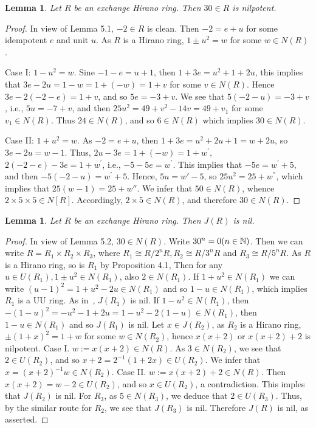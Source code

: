 \documentclass[12pt, reqno]{amsart}
\newtheorem{lem}[thm]{Lemma}
\numberwithin{equation}{section}
\begin{document}
\begin{lem} Let $R$ be an exchange Hirano ring. Then $30\in R$ is nilpotent.\end{lem}
\begin{proof} In view of Lemma 5.1, $-2\in R$ is clean. Then $-2=e+u$ for some idempotent $e$ and unit $u$. As $R$ is a Hirano ring, $1\pm u^2=w$ for some $w\in N(R)$.

Case I: $1-u^2=w$. Sine $-1-e=u+1$, then $1+3e=u^2+1+2u$, this implies that $3e-2u=1-w=1+(-w)=1+v$ for some $v\in N(R)$. Hence $3e-2(-2-e)=1+v$, and so $5e=-3+v$. We see that $5(-2-u)=-3+v$, i.e., $5u=-7+v$, and then $25u^2=49+v^2-14v=49+v_1$ for some $v_1\in N(R)$. Thus $24\in N(R)$, and so $6\in N(R)$ which implies $30\in N(R)$.

Case II: $1+u^2=w$. As $-2=e+u$, then $1+3e=u^2+2u+1=w+2u$, so $3e-2u=w-1$. Thus, $2u-3e=1+(-w)=1+w^{\prime}$, $2(-2-e)-3e=1+w^{\prime}$, i.e., $-5-5e=w^{\prime}$. This implies that $-5e=w^{\prime}+5$, and then $-5(-2-u)=w^{\prime}+5$. Hence, $5u=w{\prime}-5$, so $25u^2=25+w^{''}$, which implies that $25(w-1)=25+w{''}$. We infer that $50\in N(R)$, whence $2\times 5\times 5\in N[R]$. Accordingly, $2\times 5\in N(R)$, and therefore $30\in N(R)$.\end{proof}

\begin{lem} Let $R$ be an exchange Hirano ring. Then $J(R)$ is nil.\end{lem}
\begin{proof} In view of Lemma 5.2, $30\in N(R)$. Write $30^n=0 (n\in {\Bbb N})$. Then we can write $R=R_1\times R_2\times R_3$, where $R_1\cong R/2^nR, R_2\cong R/3^nR$ and $R_3\cong R/5^nR$. As $R$ is a Hirano ring, so is $R_1$ by Proposition 4.1, Then for any $u\in U(R_1), 1\pm u^2\in N(R_1)$, also $2\in N(R_1)$. If $1+u^2\in N(R_1)$ we can write $(u-1)^2 =1+u^2-2u\in N(R_1)$ and so $1-u\in N(R_1)$, which implies $R_1$ is a UU ring. As in~\cite[Theorem 2.4]{Da}, $J(R_1)$ is nil. If $1-u^2\in N(R_1)$, then $-(1-u)^2=-u^2-1+2u=1-u^2-2(1-u)\in N(R_1)$, then $1-u\in N(R_1)$ and so $J(R_1)$ is nil. Let $x\in J(R_2)$, as $R_2$ is a Hirano ring, $\pm (1+x)^2=1+w$ for some $w\in N(R_2)$, hence $x(x+2)$ or $x(x+2)+2$ is nilpotent. Case I. $w:=x(x+2)\in N(R)$.
As $3\in N(R_2)$, we see that $2\in U(R_2)$, and so $x+2=2^{-1}(1+2x)\in U(R_2)$. We infer that $x=(x+2)^{-1}w\in N(R_2)$.
Case II. $w:=x(x+2)+2\in N(R)$. Then $x(x+2)=w-2\in U(R_2)$, and so $x\in U(R_2)$, a contradiction. This imples that $J(R_2)$ is nil.
For $R_3$, as $5\in N(R_3)$, we deduce that $2\in U(R_3)$. Thus, by the similar route for $R_2$, we see that $J(R_3)$ is nil. Therefore $J(R)$ is nil, as asserted.
\end{proof}
\end{document}
